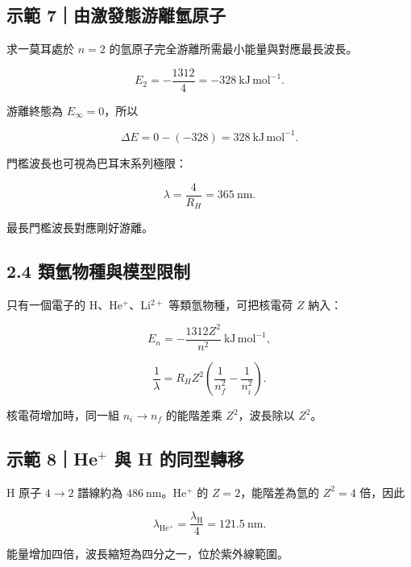 \documentclass[11pt,a4paper]{article}
\begin{document}
\begin{HandoutWorkedExample}

\subsection{示範 7｜由激發態游離氫原子}\label{ux793aux7bc4-7ux7531ux6fc0ux767cux614bux6e38ux96e2ux6c2bux539fux5b50}

求一莫耳處於 \(n=2\) 的氫原子完全游離所需最小能量與對應最長波長。

\[
E_2=-\frac{1312}{4}=-328\ \mathrm{kJ\,mol^{-1}}.
\]

游離終態為 \(E_\infty=0\)，所以

\[
\Delta E=0-(-328)=328\ \mathrm{kJ\,mol^{-1}}.
\]

門檻波長也可視為巴耳末系列極限：

\[
\lambda=\frac4{R_H}=365\ \mathrm{nm}.
\]

最長門檻波長對應剛好游離。

\end{HandoutWorkedExample}

\subsection{2.4 類氫物種與模型限制}\label{ux985eux6c2bux7269ux7a2eux8207ux6a21ux578bux9650ux5236}

只有一個電子的 H、He\(^+\)、Li\(^{2+}\) 等類氫物種，可把核電荷 \(Z\) 納入：

\[
E_n=-\frac{1312Z^2}{n^2}\ \mathrm{kJ\,mol^{-1}},
\]

\[
\frac1\lambda
=R_HZ^2\left(\frac1{n_f^2}-\frac1{n_i^2}\right).
\]

核電荷增加時，同一組 \(n_i\to n_f\) 的能階差乘 \(Z^2\)，波長除以 \(Z^2\)。

\begin{HandoutWorkedExample}

\subsection{\texorpdfstring{示範 8｜He\(^+\) 與 H 的同型轉移}{示範 8｜He\^{}+ 與 H 的同型轉移}}\label{ux793aux7bc4-8he-ux8207-h-ux7684ux540cux578bux8f49ux79fb}

H 原子 \(4\to2\) 譜線約為 \(486\ \mathrm{nm}\)。He\(^+\) 的 \(Z=2\)，能階差為氫的 \(Z^2=4\) 倍，因此

\[
\lambda_{\mathrm{He^+}}
=\frac{\lambda_{\mathrm H}}4
=121.5\ \mathrm{nm}.
\]

能量增加四倍，波長縮短為四分之一，位於紫外線範圍。

\end{HandoutWorkedExample}
\end{document}
